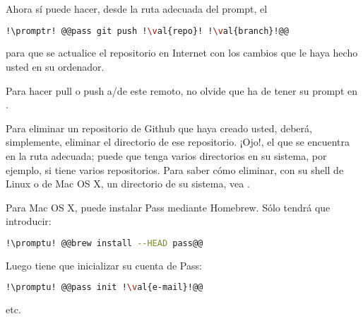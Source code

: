 Ahora sí puede hacer, desde la ruta adecuada del prompt, el

\begin{lstlisting}[gobble=2,language=bash,style=bashinteract,escapechar=!]
  !\promptr! @@pass git push !\val{repo}! !\val{branch}!@@
\end{lstlisting}

\noindent para que se actualice el repositorio en Internet con los cambios que le haya hecho usted en su
ordenador.

Para hacer pull o push a/de este remoto, no olvide que ha de tener su prompt en
.

Para eliminar un repositorio de Github que haya creado usted, deberá, simplemente, eliminar el directorio
 de ese repositorio. ¡Ojo!, el que se encuentra en la ruta adecuada; puede que tenga varios
directorios  en su sistema, por ejemplo, si tiene varios repositorios. Para saber cómo eliminar, con
su shell de Linux o de Mac OS X, un directorio de su sistema, vea .

Para Mac OS X, puede instalar Pass mediante Homebrew. Sólo tendrá que introducir:

\begin{lstlisting}[gobble=2,language=bash,style=bashinteract,escapechar=!]
  !\promptu! @@brew install --HEAD pass@@
\end{lstlisting}

Luego tiene que inicializar su cuenta de Pass:

\begin{lstlisting}[gobble=2,language=bash,style=bashinteract,escapechar=!]
  !\promptu! @@pass init !\val{e-mail}!@@
\end{lstlisting}

\noindent etc.
